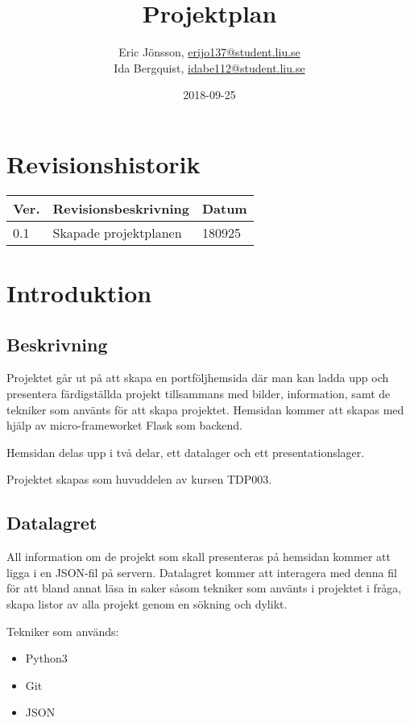 \documentclass{TDP003mall}
\author{Eric Jönsson, \url{erijo137@student.liu.se}\\
  Ida Bergquist, \url{idabe112@student.liu.se}}
\title{Projektplan}
\date{2018-09-25}
\begin{document}
\projectpage
\tableofcontents
\newpage
\section{Revisionshistorik}
\begin{table}[!h]
\begin{tabularx}{\linewidth}{|l|X|l|}
\hline
\textbf{Ver.} & \textbf{Revisionsbeskrivning} & \textbf{Datum} \\\hline
0.1 & Skapade projektplanen & 180925 \\\hline
\end{tabularx}
\end{table}

\section{Introduktion}
\subsection{Beskrivning}
Projektet går ut på att skapa en portföljhemsida där man kan
ladda upp och presentera färdigställda projekt tillsammans med bilder,
information, samt de tekniker som använts för att skapa projektet. Hemsidan
kommer att skapas med hjälp av micro-frameworket Flask som backend.

Hemsidan delas upp i två delar, ett datalager och ett presentationslager.

Projektet skapas som huvuddelen av kursen TDP003.
\subsection{Datalagret}
All information om de projekt som skall presenteras på hemsidan kommer
att ligga i en JSON-fil på servern. Datalagret kommer att interagera
med denna fil för att bland annat läsa in saker såsom tekniker som använts
i projektet i fråga, skapa listor av alla projekt genom en sökning och
dylikt.

Tekniker som används:
\begin{itemize}
\item Python3
\item Git
\item JSON
\end{itemize}
\end{document}
